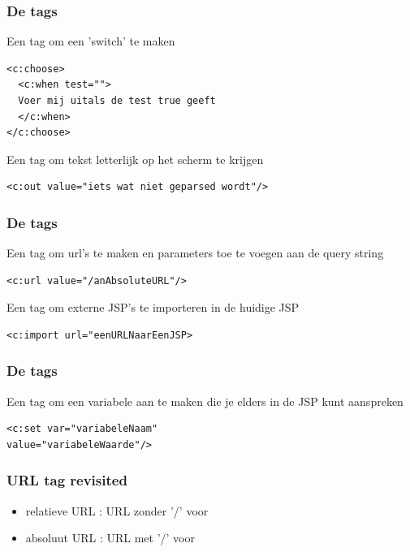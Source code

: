 \documentclass{beamer}
\begin{document}
\begin{frame}[fragile]

\frametitle{De tags}

{\Large Een tag om een 'switch' te maken

\begin{verbatim}
<c:choose>
  <c:when test=""> 
  Voer mij uitals de test true geeft 
  </c:when>
</c:choose>
\end{verbatim}

Een tag om tekst letterlijk op het scherm te krijgen

\begin{verbatim}
<c:out value="iets wat niet geparsed wordt"/>
\end{verbatim}
}

\end{frame}


\begin{frame}[fragile]

\frametitle{De tags}

{\Large Een tag om url's te maken en parameters toe te voegen aan de query string

\begin{verbatim}
<c:url value="/anAbsoluteURL"/>
\end{verbatim}

Een tag om externe JSP's te importeren in de huidige JSP

\begin{verbatim}
<c:import url="eenURLNaarEenJSP>
\end{verbatim}
}

\end{frame}


\begin{frame}[fragile]

\frametitle{De tags}

{\Large Een tag om een variabele aan te maken die je elders in de JSP kunt aanspreken

\begin{verbatim}
<c:set var="variabeleNaam" 
value="variabeleWaarde"/>
\end{verbatim}
}

\end{frame}


\begin{frame}

\frametitle{URL tag revisited}

{\LARGE \begin{itemize}
  \item relatieve URL : URL zonder '/' voor
  \item absoluut URL : URL met '/' voor
\end{itemize}}

\end{frame}
\end{document}
